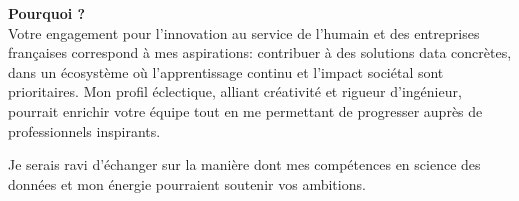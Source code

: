 \textbf{Pourquoi \Company?}\\
Votre engagement pour l'innovation au service de l'humain et des entreprises françaises correspond à mes aspirations: contribuer à des solutions data concrètes, dans un écosystème où l'apprentissage continu et l'impact sociétal sont prioritaires.
Mon profil éclectique, alliant créativité et rigueur d'ingénieur, pourrait enrichir votre équipe tout en me permettant de progresser auprès de professionnels inspirants.

Je serais ravi d'échanger sur la manière dont mes compétences en science des données et mon énergie pourraient soutenir vos ambitions.

\makeletterclosing
